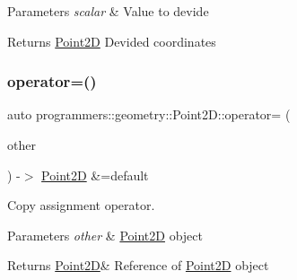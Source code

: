 \begin{DoxyParams}{Parameters}
{\em scalar} & Value to devide \\
\hline
\end{DoxyParams}
\begin{DoxyReturn}{Returns}
\hyperlink{classprogrammers_1_1geometry_1_1Point2D}{Point2D} Devided coordinates 
\end{DoxyReturn}
\mbox{\label{classprogrammers_1_1geometry_1_1Point2D_a1ccae7f5bd4db986140bf7566f3939c5}} 
\subsubsection{\texorpdfstring{operator=()}{operator=()}\hspace{0.1cm}{\footnotesize\ttfamily [1/2]}}
{\footnotesize\ttfamily auto programmers\+::geometry\+::\+Point2\+D\+::operator= (\begin{DoxyParamCaption}\item[{const \hyperlink{classprogrammers_1_1geometry_1_1Point2D}{Point2D} \&}]{other }\end{DoxyParamCaption}) -\/$>$  \hyperlink{classprogrammers_1_1geometry_1_1Point2D}{Point2D} \&=default\hspace{0.3cm}{\ttfamily [default]}}



Copy assignment operator. 


\begin{DoxyParams}{Parameters}
{\em other} & \hyperlink{classprogrammers_1_1geometry_1_1Point2D}{Point2D} object \\
\hline
\end{DoxyParams}
\begin{DoxyReturn}{Returns}
\hyperlink{classprogrammers_1_1geometry_1_1Point2D}{Point2D}\& Reference of \hyperlink{classprogrammers_1_1geometry_1_1Point2D}{Point2D} object 
\end{DoxyReturn}
\mbox{\label{classprogrammers_1_1geometry_1_1Point2D_ac5ceadc06a745b1189fceff65eda53b0}} 
